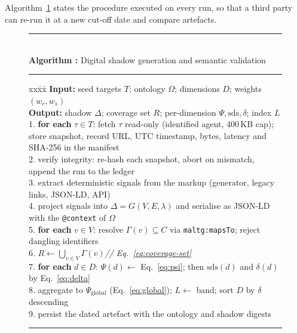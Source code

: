 \documentclass[engproc,proceedingpaper,submit,moreauthors]{Definitions/mdpi}
\newcounter{algo}
\renewcommand{\thealgo}{\arabic{algo}}
\begin{document}
Algorithm~\ref{alg:sds} states the procedure executed on every run, so that a third party can re-run it at a new cut-off date and compare artefacts.

\begin{figure}[H]
\centering
\begin{minipage}{\textwidth}
\small
{}\label{alg:sds}%
\rule{\textwidth}{0.6pt}\\[2pt]
\textbf{Algorithm \thealgo:} Digital shadow generation and semantic validation\\[-6pt]
\rule{\textwidth}{0.4pt}
\begin{tabbing}
xx\=xx\=\kill
\textbf{Input:} seed targets $T$; ontology $\Omega$; dimensions $D$; weights $(w_r,w_s)$\\
\textbf{Output:} shadow $\Delta$; coverage set $R$; per-dimension $\Psi,\mathrm{sds},\delta$; index $L$\\[2pt]
1.\> \textbf{for each} $\tau\in T$: fetch $\tau$ read-only (identified agent, 400\,KB cap);\\
\> store snapshot, record URL, UTC timestamp, bytes, latency and SHA-256 in the manifest\\
2.\> verify integrity: re-hash each snapshot, abort on mismatch, append the run to the ledger\\
3.\> extract deterministic signals from the markup (generator, legacy links, JSON-LD, API)\\
4.\> project signals into $\Delta=G(V,E,\lambda)$ and serialise as JSON-LD with the \texttt{@context} of $\Omega$\\
5.\> \textbf{for each} $v\in V$: resolve $\Gamma(v)\subseteq C$ via \texttt{maltg:mapsTo}; reject dangling identifiers\\
6.\> $R \leftarrow \bigcup_{v\in V}\Gamma(v)$\hfill\textit{// Eq.~\eqref{eq:coverage-set}}\\
7.\> \textbf{for each} $d\in D$: $\Psi(d)\leftarrow$ Eq.~\eqref{eq:psi}; then $\mathrm{sds}(d)$ and $\delta(d)$ by Eq.~\eqref{eq:delta}\\
8.\> aggregate to $\Psi_{\mathrm{global}}$ (Eq.~\eqref{eq:global}); $L\leftarrow$ band; sort $D$ by $\delta$ descending\\
9.\> persist the dated artefact with the ontology and shadow digests
\end{tabbing}
\vspace{-6pt}\rule{\textwidth}{0.6pt}
\end{minipage}
\end{figure}
\end{document}
